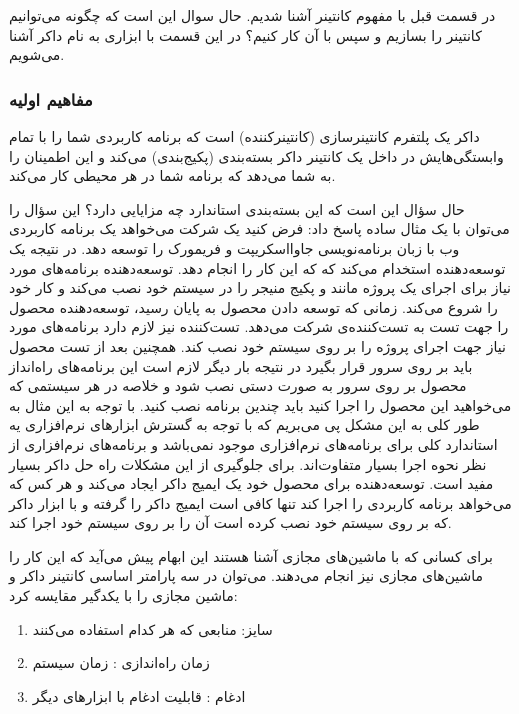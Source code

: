 در قسمت قبل با مفهوم کانتینر آشنا شدیم. حال سوال این است که چگونه می‌توانیم کانتینر را بسازیم و سپس با آن کار کنیم؟ در این قسمت با ابزاری به نام داکر آشنا می‌شویم.

\subsubsection{مفاهیم اولیه}

داکر یک پلتفرم کانتینرسازی (کانتینرکننده) است که برنامه کاربردی شما را با تمام وابستگی‌هایش در داخل یک کانتینر داکر بسته‌بندی (پکیج‌بندی) می‌کند و این اطمینان را به شما می‌دهد که برنامه شما در هر محیطی کار می‌کند.

حال سؤال این است که این بسته‌بندی استاندارد چه مزایایی دارد؟ این سؤال را می‌توان با یک مثال ساده پاسخ داد: فرض کنید یک شرکت می‌خواهد یک برنامه کاربردی وب با زبان برنامه‌نویسی جاوااسکریپت و فریمورک
را توسعه دهد. در نتیجه یک توسعه‌دهنده استخدام می‌کند که که این کار را انجام دهد. توسعه‌دهنده برنامه‌های مورد نیاز برای اجرای یک پروژه مانند
و پکیج منیجر
را در سیستم خود نصب می‌کند و کار خود را شروع می‌کند. زمانی که توسعه دادن محصول به پایان رسید، توسعه‌دهنده محصول را جهت تست به تست‌کننده‌ی شرکت می‌دهد. تست‌کننده نیز لازم دارد برنامه‌های مورد نیاز جهت اجرای پروژه را بر روی سیستم خود نصب کند. همچنین بعد از تست محصول باید بر روی سرور قرار بگیرد در نتیجه بار دیگر لازم است این برنامه‌های راه‌انداز محصول بر روی سرور به صورت دستی نصب شود و خلاصه در هر سیستمی که می‌خواهید این محصول را اجرا کنید باید چندین برنامه نصب کنید. با توجه به این مثال به طور کلی به این مشکل پی می‌بریم که با توجه به گسترش ابزارهای نرم‌افزاری یه استاندارد کلی برای برنامه‌های نرم‌افزاری موجود نمی‌باشد و برنامه‌های نرم‌افزاری از نظر نحوه اجرا بسیار متفاوت‌اند.  برای جلوگیری از این مشکلات راه حل داکر بسیار مفید است. توسعه‌دهنده برای محصول خود یک ایمیج داکر ایجاد می‌کند و هر کس که می‌خواهد برنامه کاربردی را اجرا کند تنها کافی است ایمیج داکر را گرفته و با ابزار داکر که بر روی سیستم خود نصب کرده است آن را بر روی سیستم خود اجرا کند.

برای کسانی که با ماشین‌های مجازی آشنا هستند این ابهام پیش می‌آید که این کار را ماشین‌های مجازی نیز انجام می‌دهند.  می‌توان در سه پارامتر اساسی کانتینر داکر و ماشین مجازی را با یکدگیر مقایسه کرد:
\cite{Edureka_DiveIntoDocker}

\begin{enumerate}
	\item 
	سایز: منابعی که هر کدام استفاده می‌کنند
	\item 
	زمان راه‌اندازی : زمان
	سیستم 
	\item 
	ادغام : قابلیت ادغام با ابزارهای دیگر
\end{enumerate}

